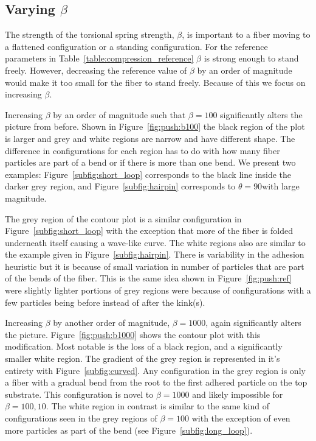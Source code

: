 \subsection{Varying $\beta$}

The strength of the torsional spring strength, $\beta$, is important to a fiber moving to a flattened configuration or a standing configuration. For the reference parameters in Table~\ref{table:compression_reference} $\beta$ is strong enough to stand freely. However, decreasing the reference value of $\beta$ by an order of magnitude would make it too small for the fiber to stand freely. Because of this we focus on increasing $\beta$.

Increasing $\beta$ by an order of magnitude such that $\beta=100$ significantly alters the picture from before. Shown in Figure~\ref{fig:push:b100} the black region of the plot is larger and grey and white regions are narrow and have different shape. The difference in configurations for each region has to do with how many fiber particles are part of a bend or if there is more than one bend. We present two examples: Figure~\ref{subfig:short_loop} corresponds to the black line inside the darker grey region, and Figure~\ref{subfig:hairpin} corresponds to $\theta=90$\textdegree with large magnitude.

The grey region of the contour plot is a similar configuration in Figure~\ref{subfig:short_loop} with the exception that more of the fiber is folded underneath itself causing a wave-like curve. The white regions also are similar to the example given in Figure~\ref{subfig:hairpin}. There is variability in the adhesion heuristic but it is because of small variation in number of particles that are part of the bends of the fiber. This is the same idea shown in Figure~\ref{fig:push:ref} were slightly lighter portions of grey regions were because of configurations with a few particles being before instead of after the kink(s).

Increasing $\beta$ by another order of magnitude, $\beta=1000$, again significantly alters the picture. Figure~\ref{fig:push:b1000} shows the contour plot with this modification. Most notable is the loss of a black region, and a significantly smaller white region. The gradient of the grey region is represented in it's entirety with Figure~\ref{subfig:curved}. Any configuration in the grey region is only a fiber with a gradual bend from the root to the first adhered particle on the top substrate. This configuration is novel to $\beta=1000$ and likely impossible for $\beta=100,10$. The white region in contrast is similar to the same kind of configurations seen in the grey regions of $\beta=100$ with the exception of even more particles as part of the bend (see Figure~\ref{subfig:long_loop}).

